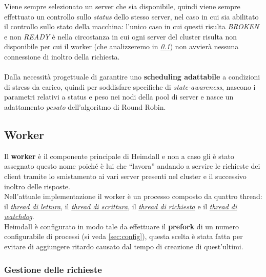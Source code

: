 \documentclass[italian]{tktltiki2}
\begin{document}
Viene sempre selezionato un server che sia disponibile, quindi viene sempre effettuato un controllo sullo \emph{status} dello stesso server, nel caso in cui sia abilitato il controllo sullo stato della macchina: l'unico caso in cui questi risulta \emph{BROKEN} e non \emph{READY} è nella circostanza in cui ogni server del cluster risulta non disponibile per cui il worker (che analizzeremo in \emph{\ref{sec:worker}}) non avvierà nessuna connessione di inoltro della richiesta. \\\\
Dalla necessità progettuale di garantire uno \textbf{scheduling adattabile} a condizioni di stress da carico, quindi per soddisfare specifiche di \emph{state-awareness}, nascono i parametri relativi a status e peso nei nodi della pool di server e nasce un adattamento \emph{pesato} dell'algoritmo di Round Robin.

\subsection{Worker}
\label{sec:worker}

Il \textbf{worker} è il componente principale di Heimdall e non a caso gli è stato assegnato questo nome poiché è lui che ``lavora'' andando a servire le richieste dei client tramite lo smistamento ai vari server presenti nel cluster e il successivo inoltro delle risposte.
\\
Nell'attuale implementazione il worker è un processo composto da quattro thread: il \hyperref[sec:reader]{\emph{thread di lettura}}, il \hyperref[sec:writer]{\emph{thread di scrittura}}, il \hyperref[sec:request]{\emph{thread di richiesta}} e il \hyperref[sec:watchdog]{\emph{thread di watchdog}}.
\\
Heimdall è configurato in modo tale da effettuare il \textbf{prefork} di un numero configurabile di processi (si veda \ref{sec:config}), questa scelta è stata fatta per evitare di aggiungere ritardo causato dal tempo di creazione di quest'ultimi.

\subsubsection{Gestione delle richieste}
\label{sec:requests_management}
\end{document}
